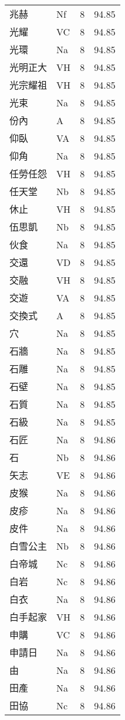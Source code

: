 \documentclass[twocolumn]{book}
\begin{document}
\begin{supertabular}{llrr}
兆赫 & Nf & 8 &  94.85\\
光耀 & VC & 8 &  94.85\\
光環 & Na & 8 &  94.85\\
光明正大 & VH & 8 &  94.85\\
光宗耀祖 & VH & 8 &  94.85\\
光束 & Na & 8 &  94.85\\
份內 & A & 8 &  94.85\\
仰臥 & VA & 8 &  94.85\\
仰角 & Na & 8 &  94.85\\
任勞任怨 & VH & 8 &  94.85\\
任天堂 & Nb & 8 &  94.85\\
休止 & VH & 8 &  94.85\\
伍思凱 & Nb & 8 &  94.85\\
伙食 & Na & 8 &  94.85\\
交還 & VD & 8 &  94.85\\
交融 & VH & 8 &  94.85\\
交遊 & VA & 8 &  94.85\\
交換式 & A & 8 &  94.85\\
穴 & Na & 8 &  94.85\\
石牆 & Na & 8 &  94.85\\
石雕 & Na & 8 &  94.85\\
石壁 & Na & 8 &  94.85\\
石質 & Na & 8 &  94.85\\
石級 & Na & 8 &  94.85\\
石匠 & Na & 8 &  94.86\\
石 & Nb & 8 &  94.86\\
矢志 & VE & 8 &  94.86\\
皮猴 & Na & 8 &  94.86\\
皮疹 & Na & 8 &  94.86\\
皮件 & Na & 8 &  94.86\\
白雪公主 & Nb & 8 &  94.86\\
白帝城 & Nc & 8 &  94.86\\
白岩 & Nc & 8 &  94.86\\
白衣 & Na & 8 &  94.86\\
白手起家 & VH & 8 &  94.86\\
申購 & VC & 8 &  94.86\\
申請日 & Na & 8 &  94.86\\
由 & Na & 8 &  94.86\\
田產 & Na & 8 &  94.86\\
田協 & Nc & 8 &  94.86\\

\end{supertabular}
\end{document}
